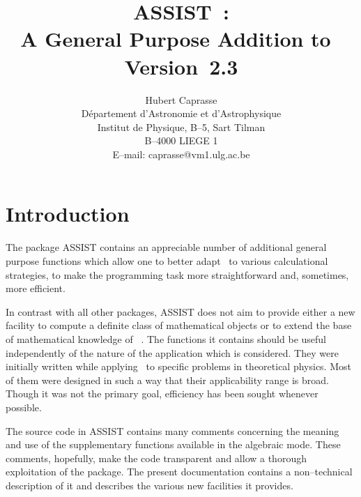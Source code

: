 \newcommand{\nl}{\hfill\newline}
\newcommand{\bq}{\begin{quotation}}
\newcommand{\eq}{\end{quotation}}
\newcommand{\bi}{\begin{itemize}}
\newcommand{\ei}{\end{itemize}}
\title{{\bf ASSIST}\ :\\[2pt]
 A General Purpose Addition to~\REDUCE \\[5pt]
       \mbox{\hfill Version 2.3\hfil}}
\author{Hubert Caprasse \\
D\'epartement d'Astronomie et d'Astrophysique \\
Institut de Physique, B--5, Sart Tilman \\
B--4000 LIEGE 1 \\[3pt]
E--mail: caprasse@vm1.ulg.ac.be}

\maketitle
\section{Introduction}
 The package ASSIST contains
an appreciable number of additional general purpose functions which allow
one to better adapt \REDUCE\ to various calculational strategies,
to make the programming task more straightforward and, sometimes, 
more efficient.

In contrast with all other packages, ASSIST does not aim to provide either a
new facility to compute a definite class of mathematical objects or to extend
the base of mathematical knowledge of \REDUCE\ .
The functions it contains should be
useful independently of the nature of the application which is considered.
They were initially written while applying \REDUCE\ to specific problems in
theoretical physics. Most of them were designed
in such a way that their applicability range is broad. Though it was not
the primary goal, efficiency has been sought whenever possible.

The source code in ASSIST contains many comments concerning
the meaning and use of the supplementary functions available
in the algebraic mode. These comments, hopefully, make the code transparent
and allow a thorough exploitation of the package. The present documentation
contains a non--technical description of it and describes the
various new facilities it provides.
